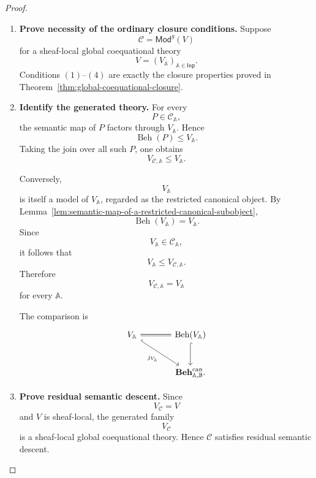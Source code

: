 \begin{proof}
    \leavevmode
    \begin{enumerate}
        \item \textbf{Prove necessity of the ordinary closure conditions.}
        Suppose
        \[
            \mathcal C=\mathsf{Mod}^{g}(V)
        \]
        for a sheaf-local global coequational theory
        \[
            V=(V_{\mathbb A})_{\mathbb A\in\mathsf{Inp}}.
        \]
        Conditions \((1)\)--\((4)\) are exactly the closure properties proved
        in Theorem~\ref{thm:global-coequational-closure}.

        \item \textbf{Identify the generated theory.}
        For every
        \[
            P\in\mathcal C_{\mathbb A},
        \]
        the semantic map of \(P\) factors through \(V_{\mathbb A}\). Hence
        \[
            \operatorname{Beh}(P)\leq V_{\mathbb A}.
        \]
        Taking the join over all such \(P\), one obtains
        \[
            V_{\mathcal C,\mathbb A}\leq V_{\mathbb A}.
        \]

        Conversely,
        \[
            V_{\mathbb A}
        \]
        is itself a model of \(V_{\mathbb A}\), regarded as the restricted
        canonical object. By
        Lemma~\ref{lem:semantic-map-of-a-restricted-canonical-subobject},
        \[
            \operatorname{Beh}(V_{\mathbb A})=V_{\mathbb A}.
        \]
        Since
        \[
            V_{\mathbb A}\in\mathcal C_{\mathbb A},
        \]
        it follows that
        \[
            V_{\mathbb A}\leq V_{\mathcal C,\mathbb A}.
        \]
        Therefore
        \[
            V_{\mathcal C,\mathbb A}=V_{\mathbb A}
        \]
        for every \(\mathbb A\).

        The comparison is
        \[
        \begin{tikzcd}[column sep=large, row sep=large]
            V_{\mathbb A}
                \arrow[r, equal]
                \arrow[dr, hook, "j_{V_{\mathbb A}}"']
            &
            \operatorname{Beh}(V_{\mathbb A})
                \arrow[d, hook]
            \\
            &
            \mathbf{Beh}^{\mathrm{can}}_{\mathbb A,\mathbb B}.
        \end{tikzcd}
        \]

        \item \textbf{Prove residual semantic descent.}
        Since
        \[
            V_{\mathcal C}=V
        \]
        and \(V\) is sheaf-local, the generated family
        \[
            V_{\mathcal C}
        \]
        is a sheaf-local global coequational theory. Hence \(\mathcal C\)
        satisfies residual semantic descent.


\end{enumerate}
\end{proof}
